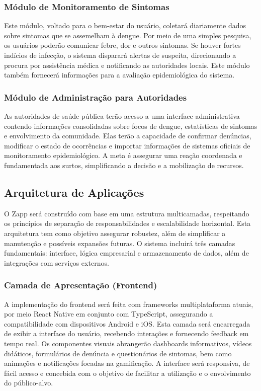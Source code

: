\documentclass[a5paper, 12pt]{article}
\begin{document}
\subsubsection{Módulo de Monitoramento de Sintomas}

Este módulo, voltado para o bem-estar do usuário, coletará diariamente dados sobre sintomas que se assemelham à dengue.  Por meio de uma simples pesquisa, os usuários poderão comunicar febre, dor e outros sintomas.  Se houver fortes indícios de infecção, o sistema disparará alertas de suspeita, direcionando a procura por assistência médica e notificando as autoridades locais.  Este módulo também fornecerá informações para a avaliação epidemiológica do sistema.

\subsubsection{Módulo de Administração para Autoridades}

As autoridades de saúde pública terão acesso a uma interface administrativa contendo informações consolidadas sobre focos de dengue, estatísticas de sintomas e envolvimento da comunidade.  Elas terão a capacidade de confirmar denúncias, modificar o estado de ocorrências e importar informações de sistemas oficiais de monitoramento epidemiológico.  A meta é assegurar uma reação coordenada e fundamentada aos surtos, simplificando a decisão e a mobilização de recursos.


\subsection{Arquitetura de Aplicações}

O Zapp será construído com base em uma estrutura multicamadas, respeitando os princípios de separação de responsabilidades e escalabilidade horizontal.  Esta arquitetura tem como objetivo assegurar robustez, além de simplificar a manutenção e possíveis expansões futuras.  O sistema incluirá três camadas fundamentais: interface, lógica empresarial e armazenamento de dados, além de integrações com serviços externos.

\subsubsection{Camada de Apresentação (Frontend)}

A implementação do frontend será feita com frameworks multiplataforma atuais, por meio React Native em conjunto com TypeScript, assegurando a compatibilidade com dispositivos Android e iOS.  Esta camada será encarregada de exibir a interface do usuário, recebendo interações e fornecendo feedback em tempo real.
Os componentes visuais abrangerão dashboards informativos, vídeos didáticos, formulários de denúncia e questionários de sintomas, bem como animações e notificações focadas na gamificação.  A interface será responsiva, de fácil acesso e concebida com o objetivo de facilitar a utilização e o envolvimento do público-alvo.
\end{document}
